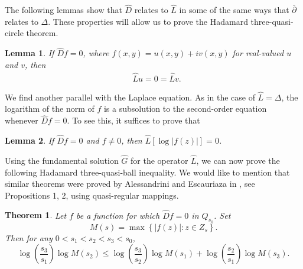 \documentclass[12pt,reqno]{amsart}
\theoremstyle{plain}
\newtheorem{thm}{Theorem}
\newtheorem{lem}{Lemma}
\theoremstyle{definition}
\newcommand{\ol}{\overline}
\newcommand{\del}{ \partial}
\newcommand{\LP}{\Delta}
\newcommand{\abs}[1]{\left\vert#1\right\vert}
\newcommand{\set}[1]{\left\{#1\right\}}
\newcommand{\brac}[1]{\left[#1\right]}
\newcommand{\pr}[1]{\left( #1 \right) }
\begin{document}
The following lemmas show that $\hat D$ relates to $\hat L$ in some of the same ways that $\ol \del$ relates to $\LP$.
These properties will allow us to prove the Hadamard three-quasi-circle theorem.

\begin{lem}{\rm\cite[Lemma~4.2]{DKW17}}
If $\hat D f = 0$, where $f\pr{x,y} = u\pr{x,y} + i v\pr{x,y}$ for real-valued $u$ and $v$, then
\begin{align*}
& \hat L u = 0 = \hat Lv.
\end{align*}
\label{rpLem}
\end{lem}

We find another parallel with the Laplace equation.  
As in the case of $\hat L = \LP$, the logarithm of the norm of ${f}$ is a subsolution to the second-order equation whenever $\hat D f = 0$. 
To see this, it suffices to prove that

\begin{lem}{\rm\cite[Lemma~4.3]{DKW17}}
If $\hat D f = 0$ and $f \ne 0$, then $\hat L\brac{ \log\abs{f\pr{z}}} = 0$.
\label{logLem}
\end{lem}

Using the fundamental solution $\hat G$ for the operator $\hat L$, we can now prove the following Hadamard three-quasi-ball inequality. 
We would like to mention that similar theorems were proved by Alessandrini and Escauriaza in \cite{AE08}, see Propositions 1, 2, using quasi-regular mappings.
\begin{thm}
Let $f$ be a function for which $\hat D f = 0$ in $Q_{s_0}$.
Set
$$M\pr{s} = \max\set{\abs{f\pr{z}} : z \in Z_s }.$$
Then for any $0 < s_1 < s_2 < s_3 < s_0$,
\begin{equation}
\log\pr{\frac{s_3}{s_1}} \log M\pr{s_2} \le \log\pr{\frac{s_3}{s_2}} \log M\pr{s_1} + \log\pr{\frac{s_2}{s_1}} \log M\pr{s_3}.
\end{equation}
\label{Hadamard}
\end{thm}
\end{document}
